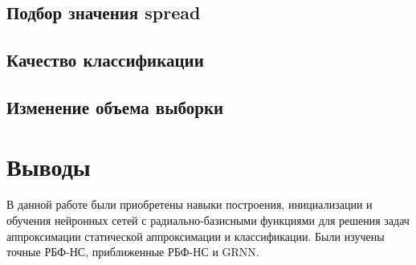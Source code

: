 \subsection{Подбор значения spread}


\subsection{Качество классификации}


\subsection{Изменение объема выборки}


\section{Выводы}

В данной работе были приобретены навыки построения, инициализации и обучения нейронных сетей с радиально-базисными функциями для решения задач аппроксимации статической аппроксимации и классификации. Были изучены точные РБФ-НС, приближенные РБФ-НС и GRNN.

